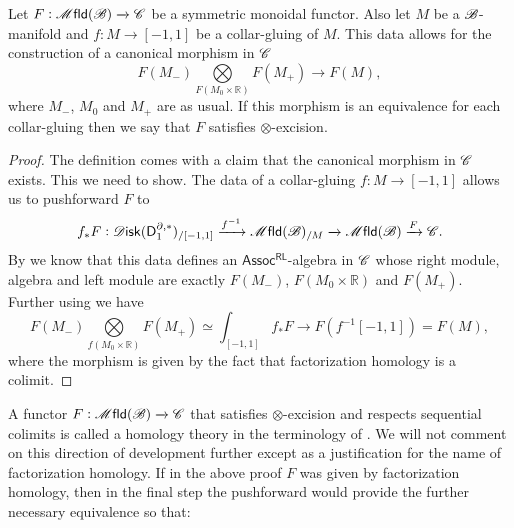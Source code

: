 \documentclass[../text]{subfiles}
\begin{document}
\begin{definition}
    Let $F: \mfld(\bstr) \xrightarrow{} \catC$ be a symmetric monoidal functor. Also let $M$ be a $\mathscr{B}$-manifold and $f: M \xrightarrow{} [-1,1]$ be a collar-gluing of $M$. This data allows for the construction of a canonical morphism in $\mathscr{C}$
    \begin{equation}
        F(M_-) \bigotimes\limits_{F(M_0 \times \mathbb{R})} F(M_+) \xrightarrow{\quad} F(M),
    \end{equation}
    where $M_-$, $M_0$ and $M_+$ are as usual. If this morphism is an equivalence for each collar-gluing then we say that $F$ satisfies $\otimes$-excision.
\end{definition}

\begin{proof}
    The definition comes with a claim that the canonical morphism in $\mathscr{C}$ exists. This we need to show. The data of a collar-gluing $f: M \xrightarrow{} [-1,1]$ allows us to pushforward $F$ to
    \begin{equation}
        f_*F: \disk (\mathsf{D}_1^{\partial, *})_{/[-1,1]} \xrightarrow{f^{-1}} \mfld(\bstr)_{/M} \xrightarrow{} \mfld(\bstr) \xrightarrow{F} \catC.
    \end{equation}
    By  we know that this data defines an $\mathsf{Assoc^{RL}}$-algebra in $\mathscr{C}$ whose right module, algebra and left module are exactly $F(M_-)$, $F(M_0 \times \mathbb{R})$ and $F(M_+)$. Further using  we have
    \begin{equation}
        F(M_-) \bigotimes\limits_{f(M_0 \times \mathbb{R})}  F(M_+)\simeq \int_{[-1,1]} f_* F \xrightarrow{\quad} F (f^{-1}[-1,1]) = F(M),
    \end{equation}
    where the morphism is given by the fact that factorization homology is a colimit.
\end{proof}


\begin{remark}
    A functor $F: \mfld(\bstr) \xrightarrow{} \catC$ that satisfies $\otimes$-excision and respects sequential colimits is called a homology theory in the terminology of \cite{af_fhtop}. We will not comment on this direction of development further except as a justification for the name of factorization homology. If in the above proof $F$ was given by factorization homology, then in the final step the pushforward would provide the further necessary equivalence so that:
\end{remark}
\end{document}
